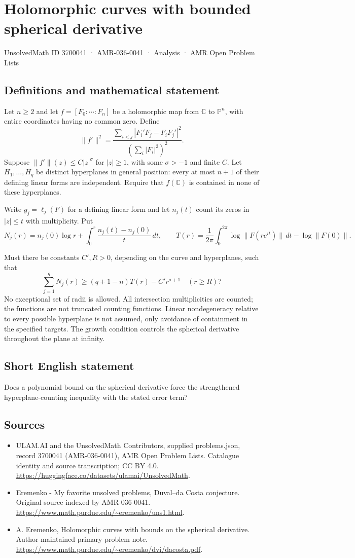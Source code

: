 \documentclass[11pt,a4paper]{article}
\begin{document}
\section*{Holomorphic curves with bounded spherical derivative}\label{3700041}
{\small UnsolvedMath ID 3700041 · AMR-036-0041 · Analysis · AMR Open Problem Lists}
\subsection{Definitions and mathematical statement}
Let $n\geq2$ and let $f=[F_0:\cdots:F_n]$
be a holomorphic map from $\mathbb C$ to
$\mathbb P^n$, with entire coordinates having no
common zero. Define
\[
 \|f'\|^2=
 \frac{\sum_{i<j}|F_i'F_j-F_iF_j'|^2}
                  {(\sum_i|F_i|^2)^2}.
\]
Suppose $\|f'\|(z)\leq C|z|^\sigma$ for
$|z|\geq1$, with some $\sigma>-1$ and
finite $C$.
Let $H_1,\ldots,H_q$ be distinct hyperplanes
in general position: every at most $n+1$
of their defining linear forms are independent.
Require that $f(\mathbb C)$ is contained in
none of these hyperplanes.

Write $g_j=\ell_j(F)$ for a defining
linear form and let $n_j(t)$ count its
zeros in $|z|\leq t$ with multiplicity.
Put
\[
 N_j(r)=n_j(0)\log r+
           \int_0^r\frac{n_j(t)-n_j(0)}t\,dt,\qquad
 T(r)=\frac1{2\pi}\int_0^{2\pi}\log\|F(re^{it})\|\,dt
                                      -\log\|F(0)\|.
\]

Must there be constants $C',R>0$, depending
on the curve and hyperplanes, such that
\[
          \sum_{j=1}^q N_j(r)
                \geq(q+1-n)T(r)-C'r^{\sigma+1}
                       \quad(r\geq R)?
\]
No exceptional set of radii is allowed.
All intersection multiplicities are counted;
the functions are not truncated counting functions.
Linear nondegeneracy relative to every possible
hyperplane is not assumed, only avoidance of
containment in the specified targets. The
growth condition controls the spherical derivative
throughout the plane at infinity.
\subsection{Short English statement}
Does a polynomial bound on the spherical derivative force the strengthened hyperplane-counting inequality with the stated error term?
\subsection{Sources}
\begin{itemize}
\item[S1] ULAM.AI and the UnsolvedMath Contributors, supplied problems.json, record 3700041 (AMR-036-0041), AMR Open Problem Lists. Catalogue identity and source transcription; CC BY 4.0.
\url{https://huggingface.co/datasets/ulamai/UnsolvedMath}.
\item[S2] Eremenko - My favorite unsolved problems, Duval–da Costa conjecture. Original source indexed by AMR-036-0041.
\url{https://www.math.purdue.edu/~eremenko/uns1.html}.
\item[S3] A. Eremenko, Holomorphic curves with bounds on the spherical derivative. Author-maintained primary problem note.
\url{https://www.math.purdue.edu/~eremenko/dvi/dacosta.pdf}.
\end{itemize}
\end{document}

